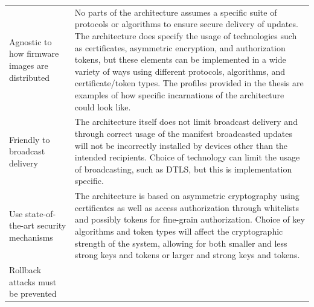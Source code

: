 \documentclass[0-thesis.tex]{subfiles}
\begin{document}
\begin{longtable}[]{@{}ll@{}}
    \begin{minipage}[t]{0.41\columnwidth}\raggedright\strut
    Agnostic to how firmware images are distributed\strut
    \end{minipage} & \begin{minipage}[t]{0.53\columnwidth}\raggedright\strut
    No parts of the architecture assumes a specific suite of protocols or
    algorithms to ensure secure delivery of updates. The architecture does
    specify the usage of technologies such as certificates, asymmetric
    encryption, and authorization tokens, but these elements can be
    implemented in a wide variety of ways using different protocols,
    algorithms, and certificate/token types. The profiles provided in the
    thesis are examples of how specific incarnations of the architecture
    could look like.\strut
    \end{minipage}\tabularnewline
    \begin{minipage}[t]{0.41\columnwidth}\raggedright\strut
    Friendly to broadcast delivery\strut
    \end{minipage} & \begin{minipage}[t]{0.53\columnwidth}\raggedright\strut
    The architecture itself does not limit broadcast delivery and through
    correct usage of the manifest broadcasted updates will not be
    incorrectly installed by devices other than the intended recipients.
    Choice of technology can limit the usage of broadcasting, such as DTLS,
    but this is implementation specific.\strut
    \end{minipage}\tabularnewline
    \begin{minipage}[t]{0.41\columnwidth}\raggedright\strut
    Use state-of-the-art security mechanisms\strut
    \end{minipage} & \begin{minipage}[t]{0.53\columnwidth}\raggedright\strut
    The architecture is based on asymmetric cryptography using certificates
    as well as access authorization through whitelists and possibly tokens
    for fine-grain authorization. Choice of key algorithms and token types
    will affect the cryptographic strength of the system, allowing for both
    smaller and less strong keys and tokens or larger and strong keys and
    tokens.\strut
    \end{minipage}\tabularnewline
    \begin{minipage}[t]{0.41\columnwidth}\raggedright\strut
    Rollback attacks must be prevented\strut
    \end{minipage} & \begin{minipage}[t]{0.53\columnwidth}\raggedright\strut

\end{minipage}
\end{longtable}
\end{document}
